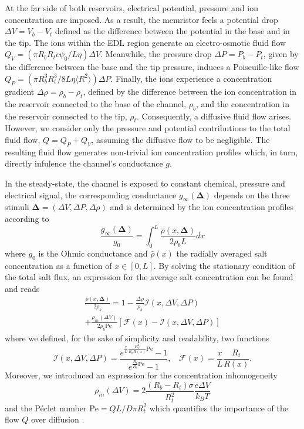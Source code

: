\documentclass[reprint,superscriptaddress,prb,showkeys]{revtex4-2}
\newcommand{\brac}[1]{\left(#1 \right)} %
\begin{document}
At the far side of both reservoirs, electrical potential, pressure and ion concentration are imposed. As a result, the memristor feels a potential drop $\Delta V = V_b - V_t$ defined as the difference between the potential in the base and in the tip. The ions within the EDL region generate an electro-osmotic fluid flow $Q_V = (\pi R_b R_t\epsilon\psi_0/L\eta)\Delta V$. Meanwhile, the pressure drop $\Delta P = P_b - P_t$, given by the difference between the base and the tip pressure, induces a Poiseuille-like flow $Q_P = (\pi R_b^3 R_t^3/8L\eta\langle R^2\rangle)\Delta P$. Finally, the ions experience a concentration gradient $\Delta \rho = \rho_b - \rho_t$, defined by the difference between the ion concentration in the reservoir connected to the base of the channel, $\rho_b$, and the concentration in the reservoir connected to the tip, $\rho_t$. Consequently, a diffusive fluid flow arises. However, we consider only the pressure and potential contributions to the total fluid flow, $Q = Q_P + Q_V$, assuming the diffusive flow to be negligible.  The resulting fluid flow generates non-trivial ion concentration profiles which, in turn, directly infulence the channel's conductance $g$. 

In the steady-state, the channel is exposed to constant chemical, pressure and electrical signal, the corresponding conductance $g_{\infty}\brac{\boldsymbol{\Delta}}$ depends on the three stimuli $\boldsymbol{\Delta}= (\Delta V, \Delta P, \Delta \rho)$ and is determined by the ion concentration profiles according to 
\[
\frac{g_{\infty}\brac{\boldsymbol{\Delta}}}{g_0} = \int_0^{L} \frac{\bar{\rho}\left(x, \boldsymbol{\Delta}\right)}{2\rho_b L} dx                                           
\]
where $g_0$ is the Ohmic conductance and $\bar{\rho}(x)$ the radially averaged salt concentration as a function of $x\in[0,L]$\cite{Rene_IonicNeuromorphic}. By solving the stationary condition of the total salt flux, an expression for the average salt concentration can be found and reads
\begin{multline}
\frac{\bar{\rho}\left(x, \boldsymbol{\Delta}\right)}{2\rho_b} = 1 - \frac{\Delta \rho}{\rho_b} \mathcal{I}\left(x, \Delta V, \Delta P\right) \\
 + \frac{ \rho_{in}\left( \Delta V \right) }{2\rho_b \text{Pe}} \left[ \mathcal{F}(x) - \mathcal{I}\left(x, \Delta V, \Delta P\right) \right]
\label{eq:rho_average}
\end{multline}
where we defined, for the sake of simplicity and readability, two functions
\[
\mathcal{I}\left(x, \Delta V, \Delta P\right) = \frac{e^{\frac{x}{L}\frac{R_t^2}{R_b R(x)} \text{Pe}}-1}{e^{\frac{R_t}{R_b} \text{Pe}}-1}, \ \ \ \ \mathcal{F}(x) = \frac{x}{L}\frac{R_t}{R(x)}.
\]
Moreover, we introduced an expression for the concentration inhomogeneity 
\[
\rho_{in}\brac{\Delta V} = 2\frac{(R_b-R_t)\sigma}{R_t^2}\frac{e\Delta V}{k_B T}
\]
and the Péclet number
$
\text{Pe} = QL/D\pi R_t^2
$
which quantifies the importance of the flow $Q$ over diffusion \cite{Rene_PressureSensitive}.
\end{document}
